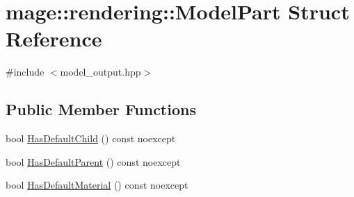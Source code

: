 \hypertarget{structmage_1_1rendering_1_1_model_part}{}\section{mage\+:\+:rendering\+:\+:Model\+Part Struct Reference}
\label{structmage_1_1rendering_1_1_model_part}


{\ttfamily \#include $<$model\+\_\+output.\+hpp$>$}

\subsection*{Public Member Functions}
\begin{DoxyCompactItemize}
\item 
bool \mbox{\hyperlink{structmage_1_1rendering_1_1_model_part_ab4118a267808c18556b0fa10949bcb0b}{Has\+Default\+Child}} () const noexcept
\item 
bool \mbox{\hyperlink{structmage_1_1rendering_1_1_model_part_ac452d6bba03decae31646eec0329c4ab}{Has\+Default\+Parent}} () const noexcept
\item 
bool \mbox{\hyperlink{structmage_1_1rendering_1_1_model_part_aae8cebe1ec39e939b53fc3f7330984a8}{Has\+Default\+Material}} () const noexcept
\end{DoxyCompactItemize}
